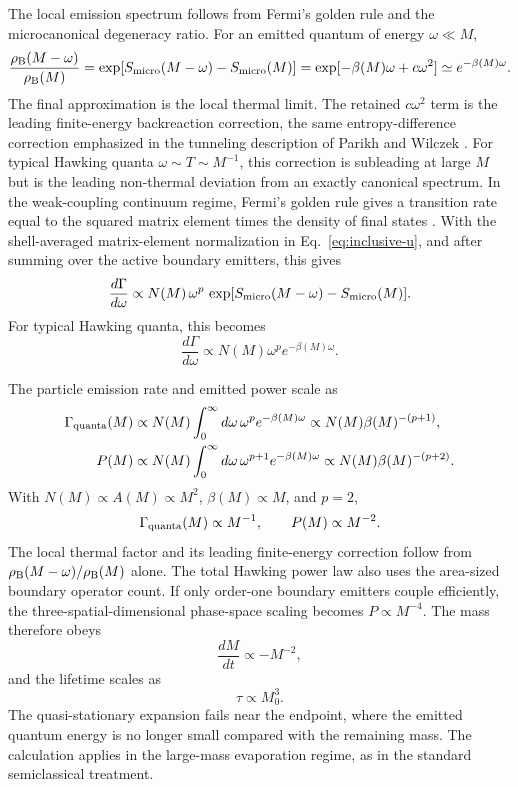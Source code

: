 \documentclass[12pt]{article}
\newcommand{\Smicro}{S_{\rm micro}}
\newcommand{\rhoB}{\rho_{\rm B}}
\begin{document}
The local emission spectrum follows from Fermi's golden rule and the
microcanonical degeneracy ratio.  For an emitted quantum of energy
$\omega\ll M$,
\begin{equation}
    \frac{\rhoB(M-\omega)}
         {\rhoB(M)}
    =
    \exp[\Smicro(M-\omega)-\Smicro(M)]
    =
    \exp[-\beta(M)\omega+c\omega^2]
    \simeq e^{-\beta(M)\omega}.
\end{equation}
The final approximation is the local thermal limit.  The retained
$c\omega^2$ term is the leading finite-energy backreaction correction, the
same entropy-difference correction emphasized in the tunneling description of
Parikh and Wilczek \cite{ParikhWilczek2000}.  For typical Hawking quanta
$\omega\sim T\sim M^{-1}$, this correction is subleading at large $M$ but is
the leading non-thermal deviation from an exactly canonical spectrum.
In the weak-coupling continuum regime, Fermi's golden rule gives a transition
rate equal to the squared matrix element times the density of final states
\cite{Friedrichs1948,CohenTannoudji1992}.  With the shell-averaged
matrix-element normalization in Eq.~\eqref{eq:inclusive-u}, and after summing
over the active boundary emitters, this gives
\begin{equation}
    \frac{d\Gamma}{d\omega}
    \propto
    N(M)\,\omega^p\,
    \exp[\Smicro(M-\omega)-\Smicro(M)].
\end{equation}
For typical Hawking quanta, this becomes
\begin{equation}
    \frac{d\Gamma}{d\omega}
    \propto N(M)\omega^p e^{-\beta(M)\omega}.
\end{equation}

The particle emission rate and emitted power scale as
\begin{align}
    \Gamma_{\rm quanta}(M)
    &\propto
    N(M)
    \int_0^\infty d\omega\,\omega^p e^{-\beta(M)\omega}
    \propto N(M)\beta(M)^{-(p+1)},\\
    P(M)
    &\propto
    N(M)
    \int_0^\infty d\omega\,\omega^{p+1}e^{-\beta(M)\omega}
    \propto N(M)\beta(M)^{-(p+2)}.
\end{align}
With $N(M)\propto A(M)\propto M^2$, $\beta(M)\propto M$, and $p=2$,
\begin{equation}
    \Gamma_{\rm quanta}(M)\propto M^{-1},
    \qquad
    P(M)\propto M^{-2}.
\end{equation}
The local thermal factor and its leading finite-energy correction follow from
$\rhoB(M-\omega)/\rhoB(M)$ alone.  The total Hawking power law also uses the
area-sized boundary operator count.  If only order-one boundary emitters
couple efficiently, the three-spatial-dimensional phase-space scaling becomes
$P\propto M^{-4}$.
The mass therefore obeys
\begin{equation}
    \frac{dM}{dt}\propto -M^{-2},
\end{equation}
and the lifetime scales as
\begin{equation}
    \tau\propto M_0^3.
\end{equation}
The quasi-stationary expansion fails near the endpoint, where the emitted
quantum energy is no longer small compared with the remaining mass.  The
calculation applies in the large-mass evaporation regime, as in the standard
semiclassical treatment.
\end{document}
